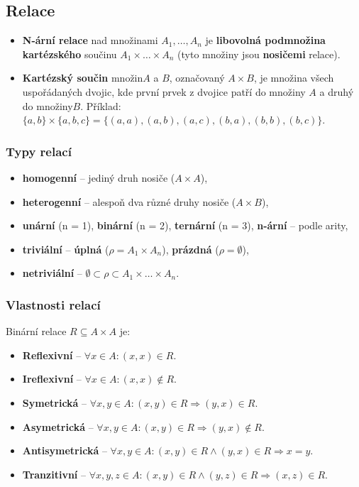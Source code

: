 \subsection{Relace}
\begin{itemize}
\item \textbf{N-ární relace} nad množinami $A_1, \ldots, A_n$ je \textbf{libovolná podmnožina kartézského} součinu $A_1 \times \ldots \times A_n$ (tyto množiny jsou \textbf{nosičemi} relace).
\item \textbf{Kartézský součin} množin$A$ a $ B $, označovaný $ A \times B $, je množina všech uspořádaných dvojic, kde první prvek z dvojice patří do množiny $ A $ a druhý do množiny$  B $. Příklad: $\{a, b\} \times \{a, b, c\} = \{(a, a), (a, b), (a, c), (b, a), (b, b), (b, c)\}$.
\end{itemize}
\subsubsection{Typy relací}
\begin{itemize}
\item \textbf{homogenní} -- jediný druh nosiče ($A \times A$),
\item \textbf{heterogenní} -- alespoň dva různé druhy nosiče ($A \times B$),
\item \textbf{unární} (n = 1), \textbf{binární} (n = 2), \textbf{ternární} (n = 3), \textbf{n-ární} -- podle arity,
\item \textbf{triviální} -- \textbf{úplná} ($\rho = A_1 \times A_n$), \textbf{prázdná} ($\rho = \emptyset$),
\item \textbf{netriviální} -- $\emptyset \subset \rho \subset A_1 \times \ldots \times A_n$.
\end{itemize}

\subsubsection{Vlastnosti relací}
Binární relace $R \subseteq A \times A$ je:

\begin{itemize}
\item \textbf{Reflexivní} -- $\forall x \in{} A: (x, x) \in{} R $.
\item \textbf{Ireflexivní} -- $\forall x \in{} A: (x, x) \notin{}R $.
\item \textbf{Symetrická} -- $\forall x, y \in{} A: (x, y) \in{}R \Rightarrow (y, x) \in{}R $.
\item \textbf{Asymetrická} -- $\forall x, y \in{} A: (x, y) \in{}R \Rightarrow (y, x) \notin{}R $.
\item \textbf{Antisymetrická} -- $\forall x, y \in{} A: (x, y) \in{}R \land (y, x) \in{}R \Rightarrow x = y$.
\item \textbf{Tranzitivní} -- $\forall x, y, z \in{} A: (x, y) \in{}R \land (y, z) \in{}R \Rightarrow (x,z) \in R$.
\end{itemize}

